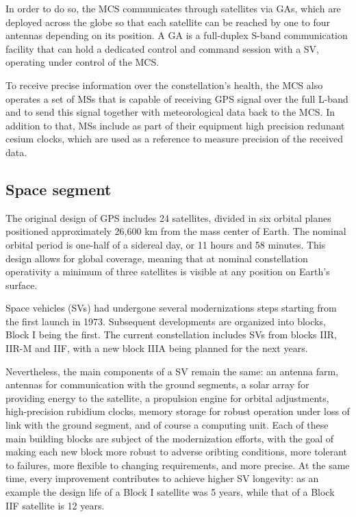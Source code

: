 In order to do so, the MCS communicates through satellites via GAs, which are
deployed across the globe so that each satellite can be reached by one to four
antennas depending on its position. A GA is a full-duplex S-band communication
facility that can hold a dedicated control and command session with a SV,
operating under control of the MCS.

To receive precise information over the constellation's health, the MCS also
operates a set of MSs that is capable of receiving GPS signal over the full
L-band and to send this signal together with meteorological data back to the
MCS. In addition to that, MSs include as part of their equipment high precision
redunant cesium clocks, which are used as a reference to measure precision of
the received data.

\subsection{Space segment}
The original design of GPS includes 24 satellites, divided in six orbital
planes positioned approximately 26,600 km from the mass center of Earth. The
nominal orbital period is one-half of a sidereal day, or 11 hours and 58
minutes. This design allows for global coverage, meaning that at nominal
constellation operativity a minimum of three satellites is visible at any
position on Earth's surface.

Space vehicles (SVs) had undergone several modernizations steps starting from
the first launch in 1973. Subsequent developments are organized into blocks,
Block I being the first. The current constellation includes SVs from blocks IIR,
IIR-M and IIF, with a new block IIIA being planned for the next years.

Nevertheless, the main components of a SV remain the same: an antenna farm,
antennas for communication with the ground segments, a solar array for providing
energy to the satellite, a propulsion engine for orbital adjustments,
high-precision rubidium clocks, memory storage for robust operation under loss
of link with the ground segment, and of course a computing unit. Each of these
main building blocks are subject of the modernization efforts, with the goal of
making each new block more robust to adverse oribting conditions, more tolerant
to failures, more flexible to changing requirements, and more precise. At the
same time, every improvement contributes to achieve higher SV longevity: as an
example the design life of a Block I satellite was 5 years, while that of a
Block IIF satellite is 12 years.

